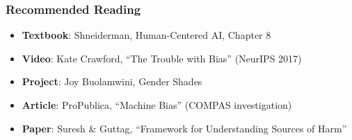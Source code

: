 \subsubsection*{Recommended Reading}
\begin{itemize}
  \item \textbf{Textbook}: Shneiderman, Human-Centered AI, Chapter 8
  \item \textbf{Video}: Kate Crawford, ``The Trouble with Bias'' (NeurIPS 2017)
  \item \textbf{Project}: Joy Buolamwini, Gender Shades
  \item \textbf{Article}: ProPublica, ``Machine Bias'' (COMPAS investigation)
  \item \textbf{Paper}: Suresh \& Guttag, ``Framework for Understanding Sources of Harm''
\end{itemize}


